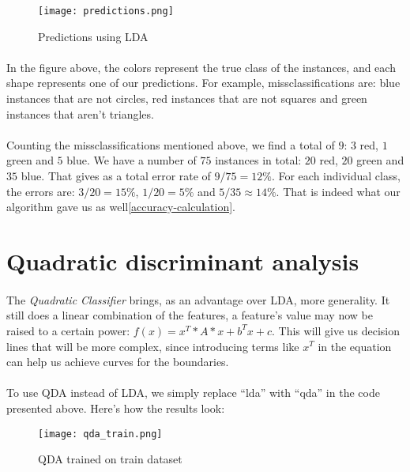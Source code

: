 \begin{figure}[h]
    \centering
    \texttt{[image: predictions.png]}
    \caption{Predictions using LDA}
\end{figure}

\clearpage

\paragraph{}
In the figure above, the colors represent the true class of the instances, and each shape represents one of our predictions.
For example, missclassifications are: blue instances that are not circles, red instances that are not squares and green instances that aren't triangles.
\paragraph{}
Counting the missclassifications mentioned above, we find a total of $9$: $3$ red, $1$ green and $5$ blue.
We have a number of $75$ instances in total: $20$ red, $20$ green and $35$ blue.
That gives as a total error rate of $9/75 = 12\%$.
For each individual class, the errors are: $3/20=15\%$, $1/20=5\%$ and $5/35\approx 14\%$.
That is indeed what our algorithm gave us as well\ref{accuracy-calculation}.


\section{Quadratic discriminant analysis}
\paragraph{}
The \emph{Quadratic Classifier} brings, as an advantage over LDA, more generality.
It still does a linear combination of the features, a feature's value may now be raised to a certain power: $f(x) = x^T*A*x + b^Tx + c$.
This will give us decision lines that will be more complex, since introducing terms like $x^T$ in the equation can help us achieve curves for the boundaries.

\paragraph{}
To use QDA instead of LDA, we simply replace ``lda'' with ``qda'' in the code presented above.
Here's how the results look:

\begin{figure}[h]
    \centering
    \texttt{[image: qda\_train.png]}
    \caption{QDA trained on train dataset}
\end{figure}

